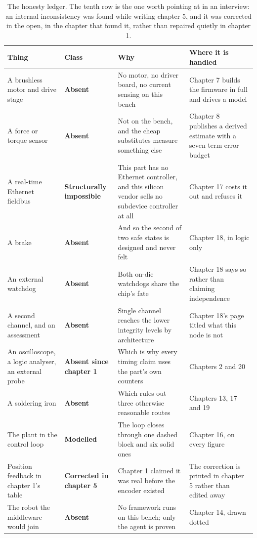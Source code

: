 \begin{table}[H]\centering\small
\begin{tabular}{p{34mm}p{22mm}p{46mm}p{36mm}}
\toprule
Thing & Class & Why & Where it is handled \\
\midrule
A brushless motor and drive stage & \textbf{Absent} & No motor, no driver board, no current sensing on this bench & Chapter 7 builds the firmware in full and drives a model \\
A force or torque sensor & \textbf{Absent} & Not on the bench, and the cheap substitutes measure something else & Chapter 8 publishes a derived estimate with a seven term error budget \\
A real-time Ethernet fieldbus & \textbf{Structurally impossible} & This part has no Ethernet controller, and this silicon vendor sells no subdevice controller at all & Chapter 17 costs it out and refuses it \\
A brake & \textbf{Absent} & And so the second of two safe states is designed and never felt & Chapter 18, in logic only \\
An external watchdog & \textbf{Absent} & Both on-die watchdogs share the chip's fate & Chapter 18 says so rather than claiming independence \\
A second channel, and an assessment & \textbf{Absent} & Single channel reaches the lower integrity levels by architecture & Chapter 18's page titled what this node is not \\
An oscilloscope, a logic analyser, an external probe & \textbf{Absent since chapter 1} & Which is why every timing claim uses the part's own counters & Chapters 2 and 20 \\
A soldering iron & \textbf{Absent} & Which rules out three otherwise reasonable routes & Chapters 13, 17 and 19 \\
The plant in the control loop & \textbf{Modelled} & The loop closes through one dashed block and six solid ones & Chapter 16, on every figure \\
Position feedback in chapter 1's table & \textbf{Corrected in chapter 5} & Chapter 1 claimed it was real before the encoder existed & The correction is printed in chapter 5 rather than edited away \\
The robot the middleware would join & \textbf{Absent} & No framework runs on this bench; only the agent is proven & Chapter 14, drawn dotted \\
\bottomrule
\end{tabular}
\caption{The honesty ledger. The tenth row is the one worth pointing at in an interview: an internal inconsistency was found while writing chapter 5, and it was corrected in the open, in the chapter that found it, rather than repaired quietly in chapter 1.}
\end{table}


